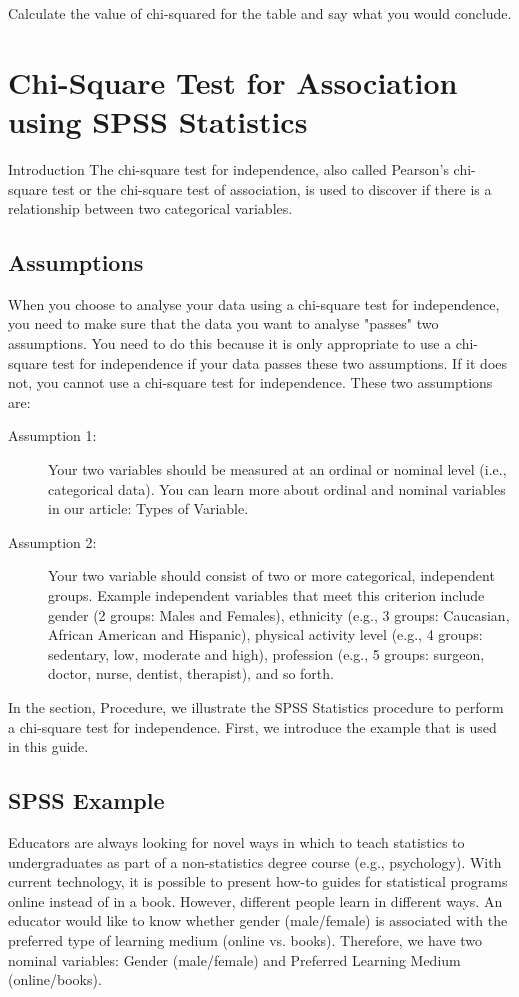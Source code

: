 \documentclass[00-IntroStatsMaster.tex]{subfiles}
\begin{document}
Calculate the value of chi-squared for the table and say what you
would conclude.




\section{Chi-Square Test for Association using SPSS Statistics}

Introduction
The chi-square test for independence, also called Pearson's chi-square test or the chi-square test of association, is used to discover if there is a relationship between two categorical variables.


\subsection{Assumptions}
When you choose to analyse your data using a chi-square test for independence, you need to make sure that the data you want to analyse "passes" two assumptions. You need to do this because it is only appropriate to use a chi-square test for independence if your data passes these two assumptions. If it does not, you cannot use a chi-square test for independence. These two assumptions are:

\begin{description}
	\item[Assumption 1:] Your two variables should be measured at an ordinal or nominal level (i.e., categorical data). You can learn more about ordinal and nominal variables in our article: Types of Variable.
	\item[Assumption 2:] Your two variable should consist of two or more categorical, independent groups. Example independent variables that meet this criterion include gender (2 groups: Males and Females), ethnicity (e.g., 3 groups: Caucasian, African American and Hispanic), physical activity level (e.g., 4 groups: sedentary, low, moderate and high), profession (e.g., 5 groups: surgeon, doctor, nurse, dentist, therapist), and so forth.
\end{description}
In the section, Procedure, we illustrate the SPSS Statistics procedure to perform a chi-square test for independence. First, we introduce the example that is used in this guide.


\subsection{SPSS Example}
Educators are always looking for novel ways in which to teach statistics to undergraduates as part of a non-statistics degree course (e.g., psychology). With current technology, it is possible to present how-to guides for statistical programs online instead of in a book. However, different people learn in different ways. An educator would like to know whether gender (male/female) is associated with the preferred type of learning medium (online vs. books). Therefore, we have two nominal variables: Gender (male/female) and Preferred Learning Medium (online/books).
\end{document}
